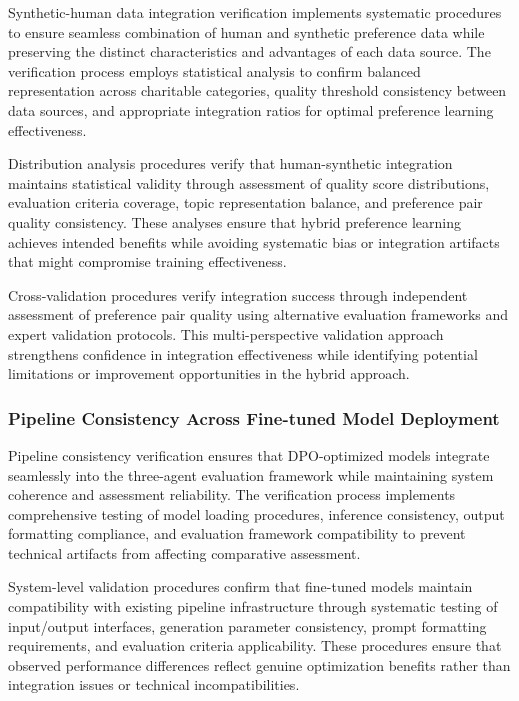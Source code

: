 Synthetic-human data integration verification implements systematic procedures to ensure seamless combination of human and synthetic preference data while preserving the distinct characteristics and advantages of each data source. The verification process employs statistical analysis to confirm balanced representation across charitable categories, quality threshold consistency between data sources, and appropriate integration ratios for optimal preference learning effectiveness.

Distribution analysis procedures verify that human-synthetic integration maintains statistical validity through assessment of quality score distributions, evaluation criteria coverage, topic representation balance, and preference pair quality consistency. These analyses ensure that hybrid preference learning achieves intended benefits while avoiding systematic bias or integration artifacts that might compromise training effectiveness.

Cross-validation procedures verify integration success through independent assessment of preference pair quality using alternative evaluation frameworks and expert validation protocols. This multi-perspective validation approach strengthens confidence in integration effectiveness while identifying potential limitations or improvement opportunities in the hybrid approach.

\subsubsection{Pipeline Consistency Across Fine-tuned Model Deployment}

Pipeline consistency verification ensures that DPO-optimized models integrate seamlessly into the three-agent evaluation framework while maintaining system coherence and assessment reliability. The verification process implements comprehensive testing of model loading procedures, inference consistency, output formatting compliance, and evaluation framework compatibility to prevent technical artifacts from affecting comparative assessment.

System-level validation procedures confirm that fine-tuned models maintain compatibility with existing pipeline infrastructure through systematic testing of input/output interfaces, generation parameter consistency, prompt formatting requirements, and evaluation criteria applicability. These procedures ensure that observed performance differences reflect genuine optimization benefits rather than integration issues or technical incompatibilities.

